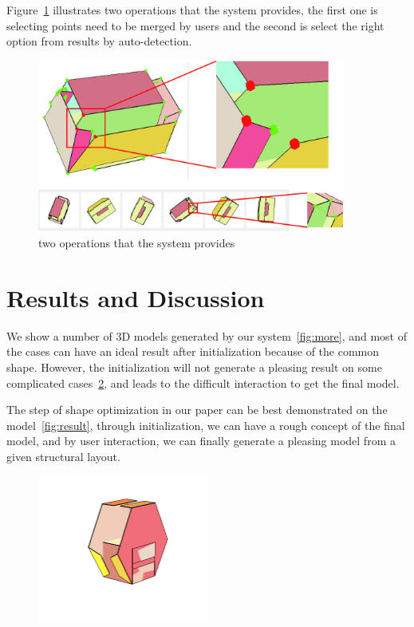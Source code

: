 \documentclass[submission]{gmp2018}
\begin{document}
Figure~\ref{fig:interface} illustrates two operations that the system provides, the first one is selecting points need to be merged by users and the second is select the right option from results by auto-detection.   

\begin{figure}
	\centering
	\includegraphics[width=0.9\textwidth]{images/UIdetail.jpg}
	\caption{two operations that the system provides}
	\label{fig:interface}
\end{figure}


\section{Results and Discussion}\label{sec:result}
{}

We show a number of 3D models generated by our system~\ref{fig:more}, and most of the cases can have an ideal result after initialization because of the common shape. However, the initialization will not generate a pleasing result on some complicated cases~\ref{fig:limitation}, and leads to the difficult interaction to get the final model. 

The step of shape optimization in our paper can be best demonstrated on the model~\ref{fig:result}, through initialization, we can have a rough concept of the final model, and by user interaction, we can finally generate a pleasing model from a given structural layout.

\begin{figure}
	\centering
	\includegraphics[width=0.5\textwidth]{images/limitation.png}
	\caption{}
	\label{fig:limitation}
\end{figure}
\end{document}
